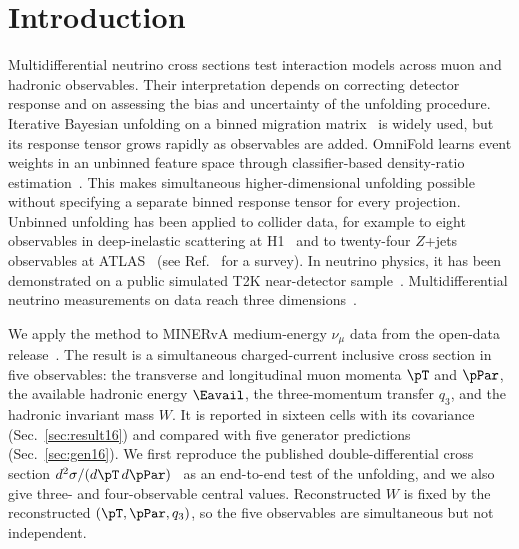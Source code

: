 \newcommand{\pcell}[2]{\parbox[t]{#1}{\raggedright\strut#2\strut}}
\newcommand{\nsec}[1]{Ref.~\cite{AnalysisNote2026}, Sec.~\ref*{N-#1}}
\newcommand{\napp}[1]{Ref.~\cite{AnalysisNote2026}, App.~\ref*{N-#1}}

\section{Introduction}
\label{sec:intro}

Multidifferential neutrino cross sections test interaction models across muon and hadronic observables.
Their interpretation depends on correcting detector response and on assessing the bias and uncertainty of the
unfolding procedure.
Iterative Bayesian unfolding on a binned migration matrix~\cite{DAgostini:1994fjx} is widely used, but its
response tensor grows rapidly as observables are added.
OmniFold learns event weights in an unbinned feature space through classifier-based density-ratio
estimation~\cite{Andreassen:2019cjw,Andreassen:2021zzk}.
This makes simultaneous higher-dimensional unfolding possible without specifying a separate binned response tensor
for every projection.
Unbinned unfolding has been applied to collider data, for example to eight observables in deep-inelastic scattering
at H1~\cite{H1:2021wkz} and to twenty-four $Z$+jets observables at ATLAS~\cite{ATLAS:2024jets} (see
Ref.~\cite{Canelli:2025guide} for a survey).
In neutrino physics, it has been demonstrated on a public simulated T2K near-detector
sample~\cite{Huang:2025omnifold}.
Multidifferential neutrino measurements on data reach three
dimensions~\cite{MINERvA:2022qelike3d,MINERvA:2026qeleme,MicroBooNE:2023inc3d,NOvA:2026inc3d}.

We apply the method to MINERvA medium-energy $\nu_{\mu}$ data from the open-data release~\cite{MINERvA:OpenData}.
The result is a simultaneous charged-current inclusive cross section in five observables: the transverse and
longitudinal muon momenta $\pT$ and $\pPar$, the available hadronic energy $\Eavail$, the three-momentum transfer
$q_{3}$, and the hadronic invariant mass $W$.
It is reported in sixteen cells with its covariance (Sec.~\ref{sec:result16}) and compared with five generator
predictions (Sec.~\ref{sec:gen16}).
We first reproduce the published double-differential cross section
$d^{2}\sigma/(d\pT\,d\pPar)$~\cite{MINERvA:2021owq} as an end-to-end test of the unfolding, and we also give
three- and four-observable central values.
Reconstructed $W$ is fixed by the reconstructed $(\pT,\pPar,q_{3})$, so the five observables are simultaneous but
not independent.

